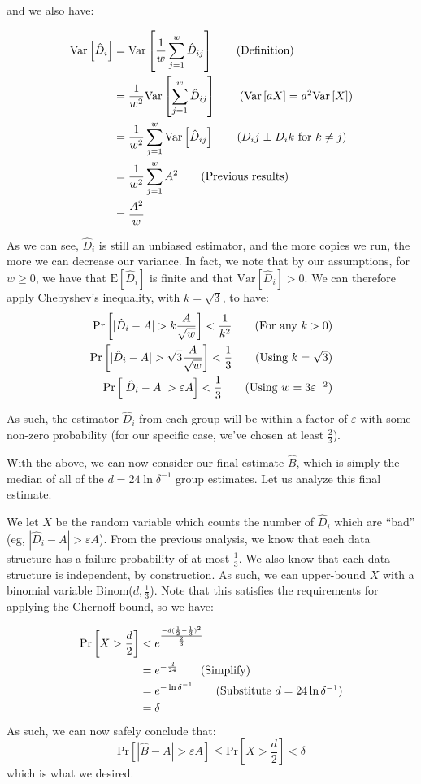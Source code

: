 \documentclass[12pt]{exam}
\newcommand*{\prob}[1]{\text{Pr} \left[ #1 \right]}
\newcommand*{\ex}[1]{\text{E} \left[ #1 \right]}
\newcommand*{\var}[1]{\text{Var} \left[ #1 \right]}
\newcommand*{\eps}{\varepsilon}  %
\begin{document}
\begin{questions}
\begin{solution}
and we also have:

\begin{align*}
  \var{\hat{D}_i} &= \var{\frac{1}{w} \sum_{j=1}^w \hat{D}_{ij}} \tag{Definition} \\
  &= \frac{1}{w^2}\var{\sum_{j=1}^w \hat{D}_{ij}} \tag{$\var{aX} = a^2\var{X}$} \\
  &= \frac{1}{w^2} \sum_{j=1}^w \var{\hat{D}_{ij}} \tag{$D_ij \perp D_ik$ for $k \neq j$} \\
  &= \frac{1}{w^2} \sum_{j=1}^w A^2 \tag{Previous results} \\
  &= \frac{A^2}{w}
\end{align*}

As we can see, $\hat{D}_i$ is still an unbiased estimator, and the more copies we run, the more we can decrease our variance. In fact, we note that by our assumptions, for $w \geq 0$, we have that $\ex{\hat{D}_i}$ is finite and that $\var{\hat{D}_i} > 0$. We can therefore apply Chebyshev's inequality, with $k = \sqrt{3}$, to have:
\begin{align*}
  \prob{|\hat{D}_i - A| > k \frac{A}{\sqrt{w}}} < \frac{1}{k^2} \tag{For any $k > 0$} \\
  \prob{|\hat{D}_i - A| > \sqrt{3} \frac{A}{\sqrt{w}}} < \frac{1}{3} \tag{Using $k = \sqrt{3}$} \\
  \prob{|\hat{D}_i - A| > \eps A} < \frac{1}{3} \tag{Using $w = 3\eps^{-2}$}
\end{align*}

As such, the estimator $\hat{D}_i$ from each group will be within a factor of $\eps$ with some non-zero probability (for our specific case, we've chosen at least $\frac{2}{3}$).

With the above, we can now consider our final estimate $\hat{B}$, which is simply the median of all of the $d = 24 \ln \delta^{-1}$ group estimates. Let us analyze this final estimate.


We let $X$ be the random variable which counts the number of $\hat{D}_i$ which are ``bad'' (eg, $|\hat{D}_i - A| > \eps A$). From the previous analysis, we know that each data structure has a failure probability of at most $\frac{1}{3}$. We also know that each data structure is independent, by construction. As such, we can upper-bound $X$ with a binomial variable Binom($d, \frac{1}{3}$). Note that this satisfies the requirements for applying the Chernoff bound, so we have:

\begin{align*}
  \prob{X > \frac{d}{2}} &< e^{\frac{-d(\frac{1}{2} - \frac{1}{3})^2}{\frac{2}{3}}} \\
  &= e^{-\frac{d}{24}} \tag{Simplify}  \\
  &= e^{-\ln \delta^{-1}} \tag{Substitute $d = 24 \ln \delta^{-1}$}\\
  &= \delta
\end{align*}
As such, we can now safely conclude that:
$$
  \prob{|\hat{B} - A| > \eps A} \leq \prob{X > \frac{d}{2}} < \delta
$$
which is what we desired.



\end{solution}
\end{questions}
\end{document}
